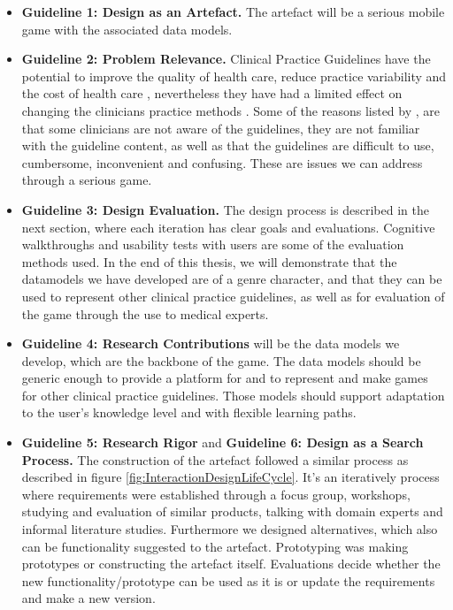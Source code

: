 \begin{itemize}
	\item \textbf{Guideline 1: Design as an Artefact.} The artefact will be a serious mobile game with the associated data models.
	\item \textbf{Guideline 2: Problem Relevance.} Clinical Practice Guidelines have the potential to improve the quality of health care, reduce practice variability and the cost of health care \parencite{DeClercq2008}, nevertheless they have had a limited effect on changing the clinicians practice methods \parencite{Cabana1999}. Some of the reasons listed by \textcite{Cabana1999}, are that some clinicians are not aware of the guidelines, they are not familiar with the guideline content, as well as that the guidelines are difficult to use, cumbersome, inconvenient and confusing. These are issues we can address through a serious game.
	\item \textbf{Guideline 3: Design Evaluation.} The design process is described in the next section, where each iteration has clear goals and evaluations. Cognitive walkthroughs and usability tests with users are some of the evaluation methods used. In the end of this thesis, we will demonstrate that the datamodels we have developed are of a genre character, and that they can be used to represent other clinical practice guidelines, as well as for evaluation of the game through the use to medical experts.
	\item \textbf{Guideline 4: Research Contributions} will be the data models we develop, which are the backbone of the game. The data models should be generic enough to provide a platform for and to represent and make games for other clinical practice guidelines. Those models should support adaptation to the user's knowledge level and with flexible learning paths.
	\item \textbf{Guideline 5: Research Rigor} and \textbf{Guideline 6: Design as a Search Process.} The construction of the artefact followed a similar process as described in figure \ref{fig:InteractionDesignLifeCycle}. It's an iteratively process where requirements were established through a focus group, workshops, studying and evaluation of similar products, talking with domain experts and informal literature studies. Furthermore we designed alternatives, which also can be functionality suggested to the artefact. Prototyping was making prototypes or constructing the artefact itself. Evaluations decide whether the new functionality/prototype can be used as it is or update the requirements and make a new version.
	

\end{itemize}
